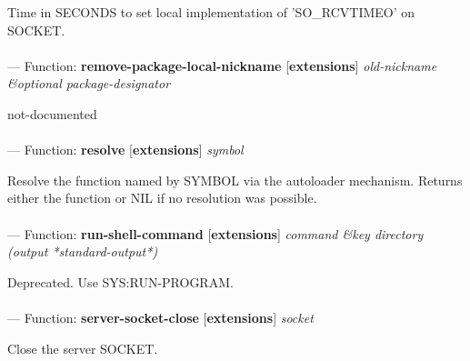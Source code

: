 \begin{adjustwidth}{5em}{5em}
Time in SECONDS to set local implementation of 'SO\_RCVTIMEO' on SOCKET.
\end{adjustwidth}

\paragraph{}
\label{EXTENSIONS:REMOVE-PACKAGE-LOCAL-NICKNAME}
--- Function: \textbf{remove-package-local-nickname} [\textbf{extensions}] \textit{old-nickname \&optional package-designator}

\begin{adjustwidth}{5em}{5em}
not-documented
\end{adjustwidth}

\paragraph{}
\label{EXTENSIONS:RESOLVE}
--- Function: \textbf{resolve} [\textbf{extensions}] \textit{symbol}

\begin{adjustwidth}{5em}{5em}
Resolve the function named by SYMBOL via the autoloader mechanism.
Returns either the function or NIL if no resolution was possible.
\end{adjustwidth}

\paragraph{}
\label{EXTENSIONS:RUN-SHELL-COMMAND}
--- Function: \textbf{run-shell-command} [\textbf{extensions}] \textit{command \&key directory (output *standard-output*)}

\begin{adjustwidth}{5em}{5em}
Deprecated.  Use SYS:RUN-PROGRAM.
\end{adjustwidth}

\paragraph{}
\label{EXTENSIONS:SERVER-SOCKET-CLOSE}
--- Function: \textbf{server-socket-close} [\textbf{extensions}] \textit{socket}

\begin{adjustwidth}{5em}{5em}
Close the server SOCKET.
\end{adjustwidth}

